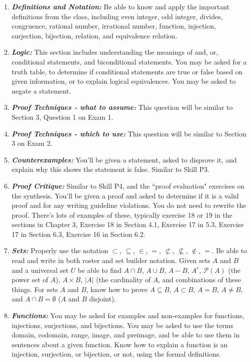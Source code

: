 \documentclass[12pt]{amsart}
\theoremstyle{definition}
\begin{document}
\begin{enumerate}
\item \emph{\bf Definitions and Notation:} Be able to know and apply the important definitions from the class, including even integer, odd integer, divides, congruence, rational number, irrational number, function, injection, surjection, bijection, relation, and equivalence relation.
\item \emph{\bf Logic:} This section includes understanding the meanings of and, or, conditional statements, and biconditional statements. You may be asked for a truth table, to determine if conditional statements are true or false based on given information, or to explain logical equivalences. You may be asked to negate a statement.
\item \emph{\bf Proof Techniques - what to assume:} This question will be similar to Section 3, Question 1 on Exam 1.
\item \emph{\bf Proof Techniques - which to use:} This question will be similar to Section 3 on Exam 2.
\item \emph{\bf Counterexamples:} You'll be given a statement, asked to disprove it, and explain why this shows the statement is false. Similar to Skill P3.
\item \emph{\bf Proof Critique:} Similar to Skill P4, and the ``proof evaluation" exercises on the synthesis. You'll be given a proof and asked to determine if it is a valid proof and for any writing guideline violations. You do not need to rewrite the proof. There's lots of examples of these, typically exercise 18 or 19 in the sections in Chapter 3, Exercise 18 in Section 4.1, Exercise 17 in 5.3, Exercise 17 in Section 6.3, Exercise 16 in Section 6.2.
\item \emph{\bf Sets:} Properly use the notation $\subset$, $\subseteq$, $\in$, $=$, $\not\subset$, $\not\subseteq$, $\notin$, $=$. Be able to read and write in both roster and set builder notation. Given sets $A$ and $B$ and a universal set $U$ be able to find $A\cap B$, $A\cup B$, $A-B$, $A^c$, $\mathcal{P}(A)$ (the power set of $A$), $A\times B$, $|A|$ (the cardinality of $A$, and combinations of these things. For sets $A$ and $B$, know how to prove $A\subseteq B$, $A\subset B$, $A=B$, $A\neq B$, and $A\cap B = \emptyset$ ($A$ and $B$ disjoint).
\item \emph{\bf Functions:} You may be asked for examples and non-examples for functions, injections, surjections, and bijections. You may be asked to use the terms domain, codomain, range, image, and preimage, and be able to use them in sentences about a given function. Know how to explain a function is an injection, surjection, or bijection, or not, using the formal definitions.

\end{enumerate}
\end{document}
